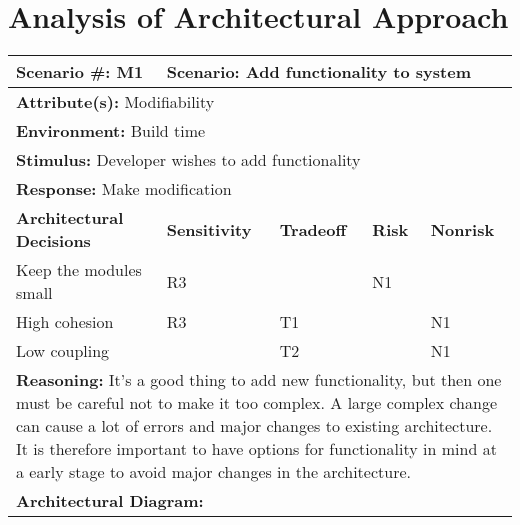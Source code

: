 \section{Analysis of Architectural Approach}


\begin{tabular}{|m{}|m{}|m{}|m{}|m{}|m{}|}
  \hline
  {\bf Scenario \#:} M1 & \multicolumn{5}{m{0.75 \textwidth}|}{{\bf Scenario:} Add functionality to system} \\ \hline
  \multicolumn{6}{|m{0.9 \textwidth}|}{{\bf Attribute(s):} Modifiability} \\ \hline
  \multicolumn{6}{|m{0.9 \textwidth}|}{{\bf Environment:} Build time} \\ \hline
  \multicolumn{6}{|m{0.9 \textwidth}|}{{\bf Stimulus:} Developer wishes to add functionality} \\ \hline
  \multicolumn{6}{|m{0.9 \textwidth}|}{{\bf Response:} Make modification} \\ \hline
  \multicolumn{2}{|m{0.3 \textwidth}|}{\bf Architectural Decisions} & {\bf Sensitivity} & {\bf Tradeoff} & {\bf Risk} & {\bf Nonrisk} \\ \hline
  \multicolumn{2}{|m{0.3 \textwidth}|}{Keep the modules small} & R3 &  & N1 &  \\ \hline
  \multicolumn{2}{|m{0.3 \textwidth}|}{High cohesion} & R3 & T1 &  & N1 \\ \hline
  \multicolumn{2}{|m{0.3 \textwidth}|}{Low coupling} &  & T2 &  & N1 \\ \hline
  \multicolumn{6}{|m{0.9 \textwidth}|}{{\bf Reasoning:} It's a good thing to add new functionality, but then one must be careful not to make it too complex. A large complex change can cause a lot of errors and major changes to existing architecture. It is therefore important to have options for functionality in mind at a early stage to avoid major changes in the architecture.} \\ \hline
  \multicolumn{6}{|m{0.9 \textwidth}|}{{\bf Architectural Diagram:} } \\ \hline
\end{tabular}



